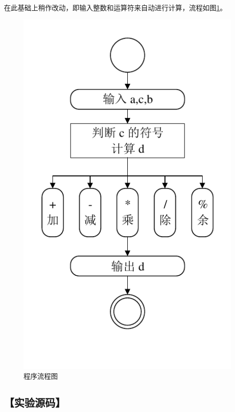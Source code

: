 在此基础上稍作改动，即输入整数和运算符来自动进行计算，流程如图\ref{aly01}。
\begin{figure}[htp]
\centering
\includegraphics{exp01/exp01.pdf}
\caption{\label{aly01}程序流程图}
\end{figure}
\subsection*{【实验源码】}
{\linespread{1}}
